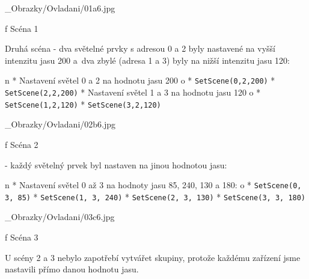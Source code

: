 \medskip {}
\picw=6.5cm _Obrazky/Ovladani/01a6.jpg
\caption/f Scéna 1
\medskip

\noindent
{\sbf Druhá scéna} - dva světelné prvky s adresou 0 a 2 byly nastavené na vyšší intenzitu jasu 200
a~dva zbylé (adresa 1 a 3) byly na nižší intenzitu jasu 120:

\begitems \style n
* {\sbf Nastavení} světel 0 a 2 na hodnotu jasu 200
    \begitems \style o
        * {\tt SetScene(0,2,200)}
        * {\tt SetScene(2,2,200)}
    \enditems
* {\sbf Nastavení} světel 1 a 3 na hodnotu jasu 120
    \begitems \style o
        * {\tt SetScene(1,2,120)}
        * {\tt SetScene(3,2,120)}
    \enditems

\enditems

\medskip {}
\picw=6.5cm _Obrazky/Ovladani/02b6.jpg
\caption/f Scéna 2
\medskip

\medskip
{} - každý světelný prvek byl nastaven na jinou hodnotou jasu:


\begitems \style n
* {\sbf Nastavení} světel 0 až 3 na hodnoty jasu 85, 240, 130 a 180:
    \begitems \style o
        * {\tt SetScene(0, 3, 85)}
        * {\tt SetScene(1, 3, 240)}
        * {\tt SetScene(2, 3, 130)}
        * {\tt SetScene(3, 3, 180)}
    \enditems

\enditems

\medskip {}
\picw=6.5cm _Obrazky/Ovladani/03c6.jpg
\caption/f Scéna 3
\medskip

\noindent U scény 2 a 3 nebylo zapotřebí vytvářet skupiny, protože každému zařízení jsme nastavili přímo danou hodnotu jasu.

